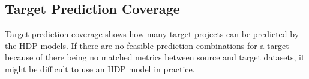 %
%
%
%
%

\subsection{Target Prediction Coverage}
\label{subsec02}
Target prediction coverage shows how many target projects can be
predicted by the HDP models. If there are no feasible prediction
combinations for a target because of there being no matched metrics
between source and target datasets, it might be difficult to use an HDP model in
practice.

